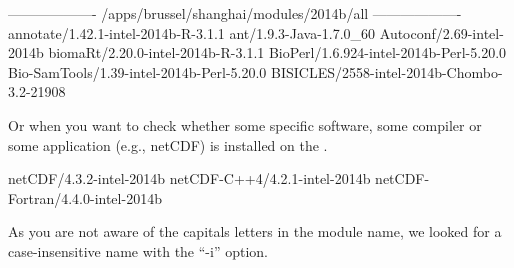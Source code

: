 \begin{prompt}
------------------- /apps/brussel/shanghai/modules/2014b/all -------------------
annotate/1.42.1-intel-2014b-R-3.1.1
ant/1.9.3-Java-1.7.0_60
Autoconf/2.69-intel-2014b
biomaRt/2.20.0-intel-2014b-R-3.1.1
BioPerl/1.6.924-intel-2014b-Perl-5.20.0
Bio-SamTools/1.39-intel-2014b-Perl-5.20.0
BISICLES/2558-intel-2014b-Chombo-3.2-21908
\end{prompt}

Or when you want to check whether some specific software, some compiler or some
application (e.g., netCDF) is installed on the \hpc.

\begin{prompt}
netCDF/4.3.2-intel-2014b
netCDF-C++4/4.2.1-intel-2014b
netCDF-Fortran/4.4.0-intel-2014b
\end{prompt}

As you are not aware of the capitals letters in the module name, we looked for
a case-insensitive name with the ``-i'' option.
